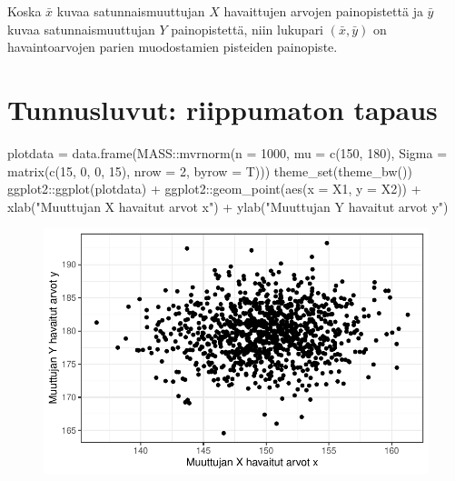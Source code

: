 \documentclass[
]{report}
\newenvironment{Shaded}{\begin{snugshade}}{\end{snugshade}}
\newcommand{\AttributeTok}[1]{\textcolor[rgb]{0.40,0.45,0.13}{#1}}
\newcommand{\DecValTok}[1]{\textcolor[rgb]{0.68,0.00,0.00}{#1}}
\newcommand{\FunctionTok}[1]{\textcolor[rgb]{0.28,0.35,0.67}{#1}}
\newcommand{\NormalTok}[1]{\textcolor[rgb]{0.00,0.23,0.31}{#1}}
\newcommand{\OtherTok}[1]{\textcolor[rgb]{0.00,0.23,0.31}{#1}}
\newcommand{\SpecialCharTok}[1]{\textcolor[rgb]{0.37,0.37,0.37}{#1}}
\newcommand{\StringTok}[1]{\textcolor[rgb]{0.13,0.47,0.30}{#1}}
\begin{document}
Koska \(\bar{x}\) kuvaa satunnaismuuttujan \(X\) havaittujen arvojen
painopistettä ja \(\bar{y}\) kuvaa satunnaismuuttujan \(Y\)
painopistettä, niin lukupari \((\bar{x},\bar{y})\) on havaintoarvojen
parien muodostamien pisteiden painopiste.

\hypertarget{tunnusluvut-riippumaton-tapaus}{%
\section{Tunnusluvut: riippumaton
tapaus}\label{tunnusluvut-riippumaton-tapaus}}

\begin{Shaded}
\begin{Highlighting}[]
\NormalTok{plotdata }\OtherTok{=} \FunctionTok{data.frame}\NormalTok{(MASS}\SpecialCharTok{::}\FunctionTok{mvrnorm}\NormalTok{(}\AttributeTok{n =} \DecValTok{1000}\NormalTok{, }\AttributeTok{mu =} \FunctionTok{c}\NormalTok{(}\DecValTok{150}\NormalTok{, }\DecValTok{180}\NormalTok{), }\AttributeTok{Sigma =} \FunctionTok{matrix}\NormalTok{(}\FunctionTok{c}\NormalTok{(}\DecValTok{15}\NormalTok{, }\DecValTok{0}\NormalTok{, }\DecValTok{0}\NormalTok{, }\DecValTok{15}\NormalTok{), }\AttributeTok{nrow =} \DecValTok{2}\NormalTok{, }\AttributeTok{byrow =}\NormalTok{ T)))}
\FunctionTok{theme\_set}\NormalTok{(}\FunctionTok{theme\_bw}\NormalTok{())}
\NormalTok{ggplot2}\SpecialCharTok{::}\FunctionTok{ggplot}\NormalTok{(plotdata) }\SpecialCharTok{+}\NormalTok{ ggplot2}\SpecialCharTok{::}\FunctionTok{geom\_point}\NormalTok{(}\FunctionTok{aes}\NormalTok{(}\AttributeTok{x =}\NormalTok{ X1, }\AttributeTok{y =}\NormalTok{ X2)) }\SpecialCharTok{+} \FunctionTok{xlab}\NormalTok{(}\StringTok{"Muuttujan X havaitut arvot x"}\NormalTok{) }\SpecialCharTok{+} \FunctionTok{ylab}\NormalTok{(}\StringTok{"Muuttujan Y havaitut arvot y"}\NormalTok{)}
\end{Highlighting}
\end{Shaded}

\begin{figure}[H]

{\centering \includegraphics{Tiivistelma6_files/figure-pdf/unnamed-chunk-2-1.pdf}

}

\end{figure}
\end{document}
